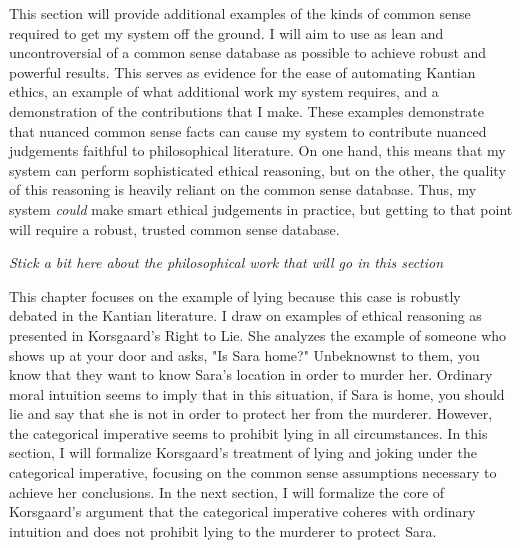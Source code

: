 \begin{isabellebody}
\begin{isamarkuptext}
This section will provide additional examples of the kinds of common sense required to get my system
off the ground. I will aim to use as lean and uncontroversial of a common sense database as possible
to achieve robust and powerful results. This serves as evidence for the ease of automating
Kantian ethics, an example of what additional work my system requires, and a demonstration of the contributions
that I make. These examples demonstrate that nuanced common sense facts can cause my system to contribute 
nuanced judgements faithful to philosophical literature. On one hand, this means that my system can perform
sophisticated ethical reasoning, but on the other, the quality of this reasoning is heavily reliant on 
the common sense database. Thus, my system \emph{could} make smart ethical judgements 
in practice, but getting to that point will require a robust, trusted common sense database.

\emph{Stick a bit here about the philosophical work that will go in this section}%
\end{isamarkuptext}\isamarkuptrue%
%
\isadelimdocument
%
\endisadelimdocument
%
\isatagdocument
%
\isamarkuptrue%
%
\endisatagdocument
{\isafolddocument}%
%
\isadelimdocument
%
\endisadelimdocument
%
\begin{isamarkuptext}%
This chapter focuses on the example of lying because this case is robustly debated in the Kantian
literature. I draw on examples of ethical reasoning as presented in Korsgaard's Right to Lie.
She analyzes the example of someone who shows up at your door and asks, "Is Sara home?" Unbeknownst to them, 
you know that they want to know Sara's location in order to murder her. Ordinary moral intuition seems
to imply that in this situation, if Sara is home, you should lie and say that she is not in order to 
protect her from the murderer. However, the categorical imperative seems to prohibit lying in all 
circumstances. In this section, I will formalize Korsgaard's treatment of lying and joking under the 
categorical imperative, focusing on the common sense assumptions necessary to achieve her conclusions. 
In the next section, I will formalize the core of Korsgaard's argument that the categorical imperative
coheres with ordinary intuition and does not prohibit lying to the murderer to protect Sara.


\end{isamarkuptext}
\end{isabellebody}
